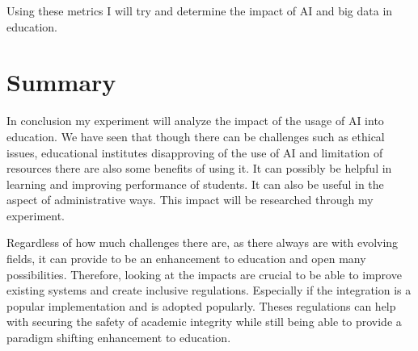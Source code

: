 \documentclass{imc-inf}
\begin{document}
Using these metrics I will try and determine the impact of AI and big data in education. 

\chapter{Summary}
In conclusion my experiment will analyze the impact of the usage of AI into education. We have seen that though there can be challenges such as ethical issues, educational institutes disapproving of the use of AI and limitation of resources there are also some benefits of using it. It can possibly be helpful in learning and improving performance of students. It can also be useful in the aspect of administrative ways. This impact will be researched through my experiment. 

Regardless of how much challenges there are, as there always are with evolving fields, it can provide to be an enhancement to education and open many possibilities. Therefore, looking at the impacts are crucial to be able to improve existing systems and create inclusive regulations. Especially if the integration is a popular implementation and is adopted popularly. Theses regulations can help with securing the safety of academic integrity while still being able to provide a paradigm shifting enhancement to education. 



\backmatter%
	
 \typeout{}
	
	

	‌
	
\end{document}
